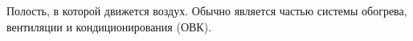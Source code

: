 Полость, в которой движется воздух. Обычно является частью
системы обогрева, вентиляции и кондиционирования (ОВК).